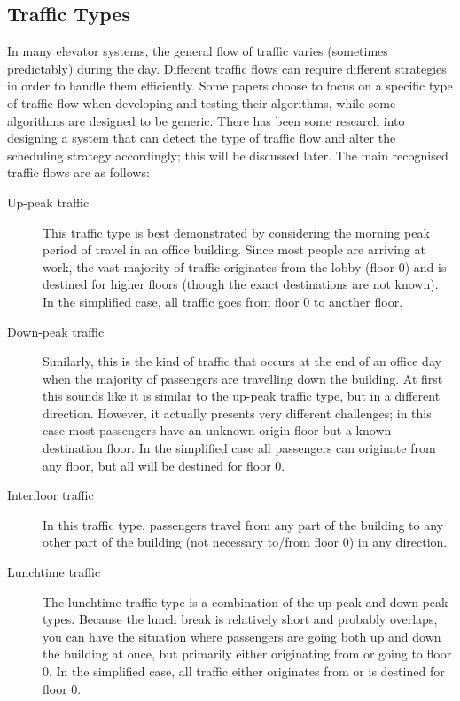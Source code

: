 \documentclass{UoYCSproject}
\begin{document}
\subsection{Traffic Types}

In many elevator systems, the general flow of traffic varies (sometimes predictably) during the day.  Different traffic flows can require different strategies in order to handle them efficiently.  Some papers choose to focus on a specific type of traffic flow when developing and testing their algorithms, while some algorithms are designed to be generic.  There has been some research into designing a system that can detect the type of traffic flow and alter the scheduling strategy accordingly; this will be discussed later.  The main recognised traffic flows are as follows:  \citep{Nikovski2003, Brand2004, Rong2003, Smith2002, Collins1993Patent, Bao1994, Pepyne1997}

\begin{description}
	\item[Up-peak traffic] This traffic type is best demonstrated by considering the morning peak period of travel in an office building.  Since most people are arriving at work, the vast majority of traffic originates from the lobby (floor 0) and is destined for higher floors (though the exact destinations are not known).  In the simplified case, all traffic goes from floor 0 to another floor.  \citep{Bao1994, Brand2004, Smith2002, Pepyne1997}
	\item[Down-peak traffic] Similarly, this is the kind of traffic that occurs at the end of an office day when the majority of passengers are travelling down the building.  At first this sounds like it is similar to the up-peak traffic type, but in a different direction.  However, it actually presents very different challenges; in this case most passengers have an unknown origin floor but a known destination floor.  In the simplified case all passengers can originate from any floor, but all will be destined for floor 0.  \citep{Bao1994, Brand2004, Smith2002, Pepyne1997}
	\item[Interfloor traffic] In this traffic type, passengers travel from any part of the building to any other part of the building (not necessary to/from floor 0) in any direction.  \citep{Pepyne1997, Collins1993Patent}
	\item[Lunchtime traffic] The lunchtime traffic type is a combination of the up-peak and down-peak types.  Because the lunch break is relatively short and probably overlaps, you can have the situation where passengers are going both up and down the building at once, but primarily either originating from or going to floor 0.  In the simplified case, all traffic either originates from or is destined for floor 0.  \citep{Bao1994, Brand2004, Smith2002, Pepyne1997}
\end{description}
\end{document}
